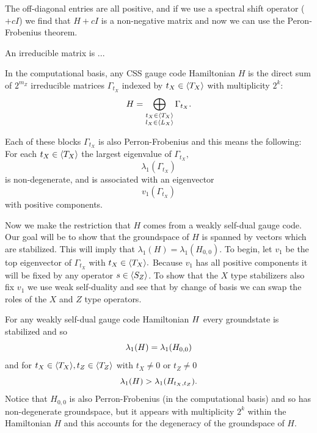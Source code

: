 \documentclass[12pt]{article}
\renewenvironment{framed}[1][\hsize]{%
\def\FrameCommand{{\color{black}\vrule width 3pt}\hspace{0pt}\fboxsep=\FrameSep\colorbox{lightgray}}%
\MakeFramed{\hsize0.8\linewidth\advance\hsize-\width\FrameRestore}}
{\endMakeFramed}
\begin{document}
The off-diagonal entries are all positive, and
if we use a spectral shift operator ($+cI$) we
find that $H+cI$ is a non-negative matrix and
now we can use the Peron-Frobenius theorem.

An irreducible matrix is ... 

\begin{framed}
In the computational basis, any CSS gauge code
Hamiltonian $H$ is the direct sum of $2^{m_Z}$
irreducible matrices $\Gamma_{t_X}$
indexed by $t_X\in\langle T_X \rangle$
with multiplicity $2^k$:
$$
    H = \bigoplus_{
    \substack{t_X\in\langle T_X \rangle\\l_X\in\langle L_X \rangle}}
        \Gamma_{t_X}.
$$
\end{framed}

Each of these blocks $\Gamma_{t_X}$ is also Perron-Frobenius
and this means the following:
\begin{framed}
For each $t_X\in\langle T_X \rangle$
the largest eigenvalue 
of $\Gamma_{t_X},$
$$\lambda_1(\Gamma_{t_X})
$$
is non-degenerate,
and is associated with an eigenvector 
$$v_1(\Gamma_{t_X})
$$
with positive components.
\end{framed}

Now we make the restriction that $H$
comes from a weakly self-dual gauge code.
Our goal will be to show that the
groundspace of $H$ is spanned
by vectors which are stabilized.
This will imply that $\lambda_1(H)=\lambda_1(H_{0,0}).$
To begin, let $v_1$ be the top
eigenvector of $\Gamma_{t_X}$ with $t_X\in\langle T_X \rangle.$
Because $v_1$ has all positive components
it will be fixed by  any operator
$s\in\langle S_Z \rangle$.
To show that the $X$ type stabilizers
also fix $v_1$ 
we use weak self-duality
and see that by change of basis
we can swap the roles of the $X$ and $Z$ type operators.
\begin{framed}

For any weakly self-dual gauge code Hamiltonian $H$
every groundstate is stabilized 
and so $$\lambda_1(H) = \lambda_1(H_{0,0})$$
and for $t_X\in\langle T_X \rangle, t_Z\in\langle T_Z \rangle$
with $t_X\ne 0$ or $t_Z\ne 0$
$$
\lambda_1(H) > \lambda_1(H_{t_X,t_Z}).
$$
\end{framed}
Notice that 
$H_{0,0}$ is also Perron-Frobenius (in the computational basis)
and so has non-degenerate
groundspace, but it appears with multiplicity $2^k$ within
the Hamiltonian $H$ and this accounts for the degeneracy of the
groundspace of $H$.
\end{document}
